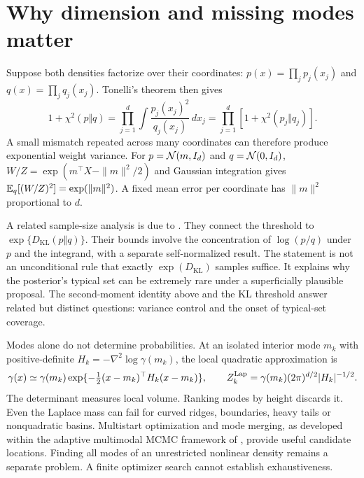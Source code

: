 \section{Why dimension and missing modes matter}

Suppose both densities factorize over their coordinates:
$p(x)=\prod_jp_j(x_j)$ and $q(x)=\prod_jq_j(x_j)$.
Tonelli's theorem then gives
\begin{equation}
 1+\chi^2(p\Vert q)
 =\prod_{j=1}^d\int\frac{p_j(x_j)^2}{q_j(x_j)}\,dx_j
 =\prod_{j=1}^d[1+\chi^2(p_j\Vert q_j)].
 \label{eq:bf-is-product}
\end{equation}
A small mismatch repeated across many coordinates can therefore produce
exponential weight variance. For $p=\mathcal{N}(m,I_d)$ and $q=\mathcal{N}(0,I_d)$,
$W/Z=\exp(m^\top X-\|m\|^2/2)$ and Gaussian integration gives
$\mathbb{E}_q[(W/Z)^2]=\exp(\|m\|^2)$. A fixed mean error per coordinate has
$\|m\|^2$ proportional to $d$.

A related sample-size analysis is due to
\citet[Theorems 1.1--1.2]{chatterjee2018sample}. They connect the threshold to $\exp\{D_{\mathrm{KL}}(p\Vert q)\}$. Their bounds involve the
concentration of $\log(p/q)$ under $p$ and the integrand, with a separate
self-normalized result. The statement is not an unconditional rule that exactly
$\exp(D_{\mathrm{KL}})$ samples suffice. It explains why the posterior's typical
set can be extremely rare under a superficially plausible proposal. The
second-moment identity above and the KL threshold answer related but distinct
questions: variance control and the onset of typical-set coverage.

Modes alone do not determine probabilities. At an isolated interior mode $m_k$
with positive-definite $H_k=-\nabla^2\log\gamma(m_k)$, the local quadratic
approximation is
\begin{equation}
 \gamma(x)\simeq\gamma(m_k)
 \exp\{-\tfrac12(x-m_k)^\top H_k(x-m_k)\},\qquad
 Z_k^{\rm Lap}=\gamma(m_k)(2\pi)^{d/2}|H_k|^{-1/2}.
 \label{eq:bf-is-laplace-mode}
\end{equation}
The determinant measures local volume. Ranking modes by height discards it.
Even the Laplace mass can fail for curved ridges, boundaries, heavy tails or
nonquadratic basins. Multistart optimization and mode merging, as developed
within the adaptive multimodal MCMC framework of
\citet[Section 2.2]{pompe2020adaptive}, provide useful candidate locations.
Finding all modes of an unrestricted nonlinear density remains a separate
problem. A finite optimizer search cannot establish exhaustiveness.

